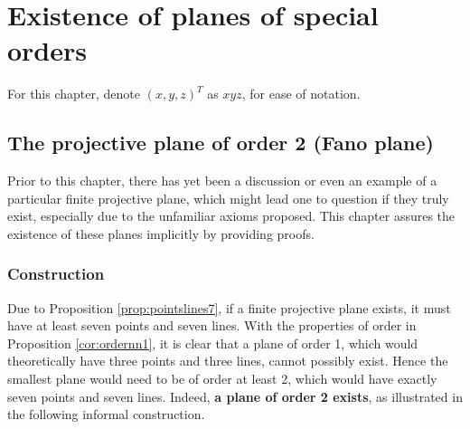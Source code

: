 \documentclass{report}
\theoremstyle{definition}\newtheorem*{definition}{Definition}
\theoremstyle{definition}\newtheorem*{example}{Example}
\theoremstyle{remark}\newtheorem*{remark}{Remark}
\begin{document}
\chapter{Existence of planes of special orders}

For this chapter, denote $ (x, y, z)^T $ as $ xyz $, for ease of notation.

\section{The projective plane of order 2 (Fano plane)}

Prior to this chapter, there has yet been a discussion or even an example of a particular finite projective plane, which might lead one to question if they truly exist, especially due to the unfamiliar axioms proposed. This chapter assures the existence of these planes implicitly by providing proofs.

\subsection{Construction}

Due to Proposition \ref{prop:pointslines7}, if a finite projective plane exists, it must have at least seven points and seven lines. With the properties of order in Proposition \ref{cor:ordernn1}, it is clear that a plane of order 1, which would theoretically have three points and three lines, cannot possibly exist. Hence the smallest plane would need to be of order at least 2, which would have exactly seven points and seven lines. 
Indeed, \textbf{a plane of order 2 exists}, as illustrated in the following informal construction.
\end{document}

